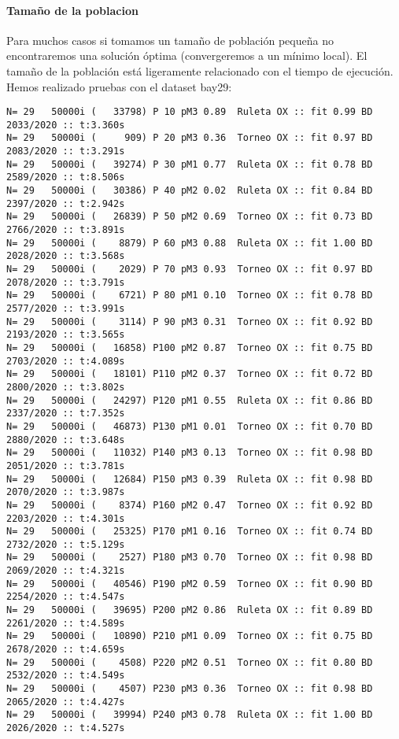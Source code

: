 \documentclass[10pt]{article}
\begin{document}
\paragraph{Tamaño de la poblacion}
Para muchos casos si tomamos un tamaño de población pequeña no encontraremos una solución óptima (convergeremos a un mínimo local). El tamaño de la población está ligeramente relacionado con el tiempo de ejecución. Hemos realizado pruebas con el dataset bay29:
\begin{Verbatim}
N= 29   50000i (   33798) P 10 pM3 0.89  Ruleta OX :: fit 0.99 BD 2033/2020 :: t:3.360s
N= 29   50000i (     909) P 20 pM3 0.36  Torneo OX :: fit 0.97 BD 2083/2020 :: t:3.291s
N= 29   50000i (   39274) P 30 pM1 0.77  Ruleta OX :: fit 0.78 BD 2589/2020 :: t:8.506s
N= 29   50000i (   30386) P 40 pM2 0.02  Ruleta OX :: fit 0.84 BD 2397/2020 :: t:2.942s
N= 29   50000i (   26839) P 50 pM2 0.69  Torneo OX :: fit 0.73 BD 2766/2020 :: t:3.891s
N= 29   50000i (    8879) P 60 pM3 0.88  Ruleta OX :: fit 1.00 BD 2028/2020 :: t:3.568s
N= 29   50000i (    2029) P 70 pM3 0.93  Torneo OX :: fit 0.97 BD 2078/2020 :: t:3.791s
N= 29   50000i (    6721) P 80 pM1 0.10  Torneo OX :: fit 0.78 BD 2577/2020 :: t:3.991s
N= 29   50000i (    3114) P 90 pM3 0.31  Torneo OX :: fit 0.92 BD 2193/2020 :: t:3.565s
N= 29   50000i (   16858) P100 pM2 0.87  Torneo OX :: fit 0.75 BD 2703/2020 :: t:4.089s
N= 29   50000i (   18101) P110 pM2 0.37  Torneo OX :: fit 0.72 BD 2800/2020 :: t:3.802s
N= 29   50000i (   24297) P120 pM1 0.55  Ruleta OX :: fit 0.86 BD 2337/2020 :: t:7.352s
N= 29   50000i (   46873) P130 pM1 0.01  Torneo OX :: fit 0.70 BD 2880/2020 :: t:3.648s
N= 29   50000i (   11032) P140 pM3 0.13  Torneo OX :: fit 0.98 BD 2051/2020 :: t:3.781s
N= 29   50000i (   12684) P150 pM3 0.39  Ruleta OX :: fit 0.98 BD 2070/2020 :: t:3.987s
N= 29   50000i (    8374) P160 pM2 0.47  Torneo OX :: fit 0.92 BD 2203/2020 :: t:4.301s
N= 29   50000i (   25325) P170 pM1 0.16  Torneo OX :: fit 0.74 BD 2732/2020 :: t:5.129s
N= 29   50000i (    2527) P180 pM3 0.70  Torneo OX :: fit 0.98 BD 2069/2020 :: t:4.321s
N= 29   50000i (   40546) P190 pM2 0.59  Torneo OX :: fit 0.90 BD 2254/2020 :: t:4.547s
N= 29   50000i (   39695) P200 pM2 0.86  Ruleta OX :: fit 0.89 BD 2261/2020 :: t:4.589s
N= 29   50000i (   10890) P210 pM1 0.09  Torneo OX :: fit 0.75 BD 2678/2020 :: t:4.659s
N= 29   50000i (    4508) P220 pM2 0.51  Torneo OX :: fit 0.80 BD 2532/2020 :: t:4.549s
N= 29   50000i (    4507) P230 pM3 0.36  Torneo OX :: fit 0.98 BD 2065/2020 :: t:4.427s
N= 29   50000i (   39994) P240 pM3 0.78  Ruleta OX :: fit 1.00 BD 2026/2020 :: t:4.527s

\end{Verbatim}
\end{document}
